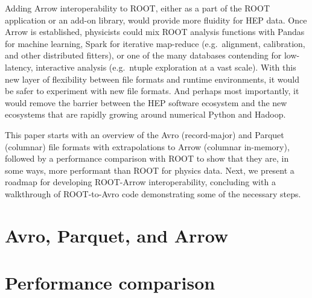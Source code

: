 \documentclass{article}
\begin{document}
Adding Arrow interoperability to ROOT, either as a part of the ROOT application or an add-on library, would provide more fluidity for HEP data. Once Arrow is established, physicists could mix ROOT analysis functions with Pandas for machine learning, Spark for iterative map-reduce (e.g.\ alignment, calibration, and other distributed fitters), or one of the many databases contending for low-latency, interactive analysis (e.g.\ ntuple exploration at a vast scale). With this new layer of flexibility between file formats and runtime environments, it would be safer to experiment with new file formats. And perhaps most importantly, it would remove the barrier between the HEP software ecosystem and the new ecosystems that are rapidly growing around numerical Python and Hadoop.

This paper starts with an overview of the Avro (record-major) and Parquet (columnar) file formats with extrapolations to Arrow (columnar in-memory), followed by a performance comparison with ROOT to show that they are, in some ways, more performant than ROOT for physics data. Next, we present a roadmap for developing ROOT-Arrow interoperability, concluding with a walkthrough of ROOT-to-Avro code demonstrating some of the necessary steps.

\section*{Avro, Parquet, and Arrow}




\vfill
\pagebreak

\section*{Performance comparison}
\end{document}
